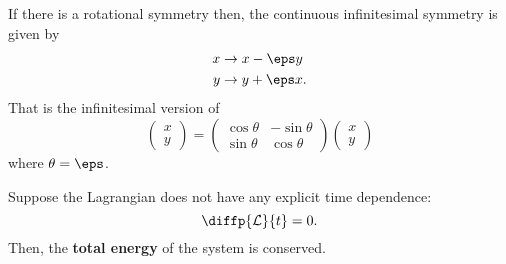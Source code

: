 \documentclass[12pt, a4paper]{article}
\begin{document}
\begin{mdexample}
    If there is a rotational symmetry then, the continuous infinitesimal symmetry is given by 
    \[\begin{aligned}
        x &\to x-\eps y \\
        y&\to y+\eps x.
    \end{aligned}\]
    That is the infinitesimal version of 
    \[\begin{pmatrix} x \\ y\end{pmatrix} = \begin{pmatrix} \cos\theta &-\sin\theta \\ \sin\theta & \cos\theta\end{pmatrix}\begin{pmatrix} x \\ y\end{pmatrix}\]
    where \(\theta = \eps\).
\end{mdexample}

\begin{mdthm}
    Suppose the Lagrangian does not have any explicit time dependence:
    \[\diffp{\mathcal{L}}{t}=0.\]
    Then, the \textbf{total energy} of the system is conserved.
\end{mdthm}
\end{document}
